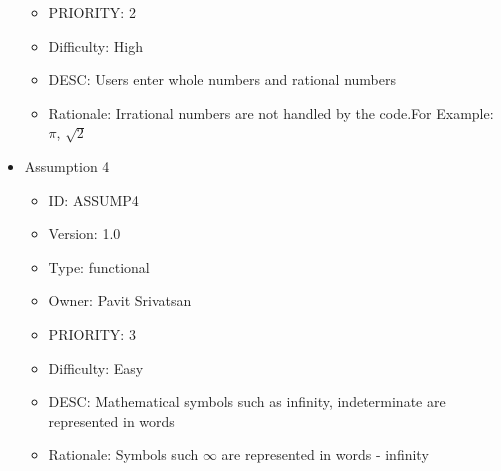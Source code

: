 \documentclass{article}
\begin{document}
\begin{itemize}
\begin{itemize}
\item PRIORITY: 2 
\item Difficulty: High
\item DESC: Users enter whole numbers and rational numbers
\item Rationale: Irrational numbers are not handled by the code.For Example: $\pi$, $\surd 2$
\end{itemize}
\item Assumption 4
\begin{itemize}
\item ID:       ASSUMP4
\item Version:  1.0
\item Type:     functional
\item Owner:    Pavit Srivatsan
\item PRIORITY: 3
\item Difficulty: Easy
\item DESC: Mathematical symbols such as infinity, indeterminate are represented in words
\item Rationale: Symbols such $\infty$ are represented in words - infinity
\end{itemize}
\end{itemize}
\end{document}
